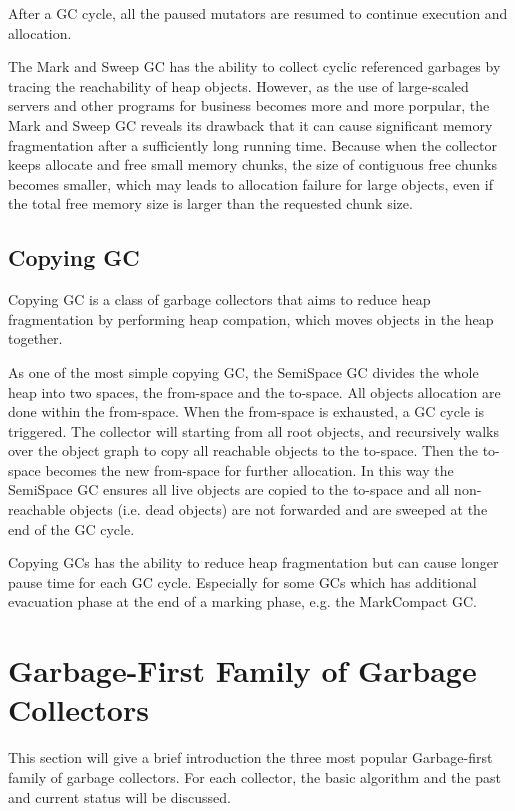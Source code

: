 After a GC cycle, all the paused mutators are resumed to continue execution and allocation.

The Mark and Sweep GC has the ability to collect cyclic referenced garbages by tracing
the reachability of heap objects. However, as the use of large-scaled servers and
other programs for business becomes more and more porpular, the Mark and Sweep GC 
reveals its drawback that it can cause significant memory fragmentation after a
sufficiently long running time. Because when the collector keeps allocate and free
small memory chunks, the size of contiguous free chunks becomes smaller, which may
leads to allocation failure for large objects, even if the total free memory size
is larger than the requested chunk size.

\subsection{Copying GC}

Copying GC is a class of garbage collectors that aims to reduce heap fragmentation
by performing heap compation, which moves objects in the heap together.

As one of the most simple copying GC, the SemiSpace GC divides the whole heap
into two spaces, the from-space and the to-space. All objects allocation are done
within the from-space. When the from-space is exhausted, a GC cycle is triggered.
The collector will starting from all root objects, and recursively walks over the
object graph to copy all reachable objects to the to-space. Then the to-space becomes
the new from-space for further allocation. In this way the SemiSpace GC ensures all
live objects are copied to the to-space and all non-reachable objects (i.e. dead objects)
are not forwarded and are sweeped at the end of the GC cycle.

Copying GCs has the ability to reduce heap fragmentation but can cause longer
pause time for each GC cycle. Especially for some GCs which has additional evacuation
phase at the end of a marking phase, e.g. the MarkCompact GC.

\section{Garbage-First Family of Garbage Collectors}
\label{sec:g1collectors}

This section will give a brief introduction the three most popular Garbage-first
family of garbage collectors. For each collector, the basic algorithm
and the past and current status will be discussed.

